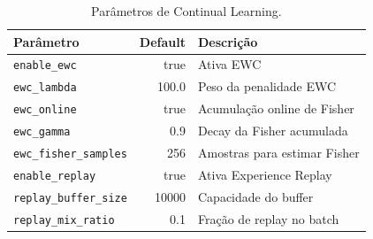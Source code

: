 \begin{table}[H]
\centering
\caption{Par\^ametros de Continual Learning.}
\label{tab:cl_config}
\begin{tabular}{lrl}
\toprule
\textbf{Par\^ametro} & \textbf{Default} & \textbf{Descri\c{c}\~ao} \\
\midrule
\texttt{enable\_ewc} & true & Ativa EWC \\
\texttt{ewc\_lambda} & 100.0 & Peso da penalidade EWC \\
\texttt{ewc\_online} & true & Acumula\c{c}\~ao online de Fisher \\
\texttt{ewc\_gamma} & 0.9 & Decay da Fisher acumulada \\
\texttt{ewc\_fisher\_samples} & 256 & Amostras para estimar Fisher \\
\texttt{enable\_replay} & true & Ativa Experience Replay \\
\texttt{replay\_buffer\_size} & 10000 & Capacidade do buffer \\
\texttt{replay\_mix\_ratio} & 0.1 & Fra\c{c}\~ao de replay no batch \\
\bottomrule
\end{tabular}
\end{table}
